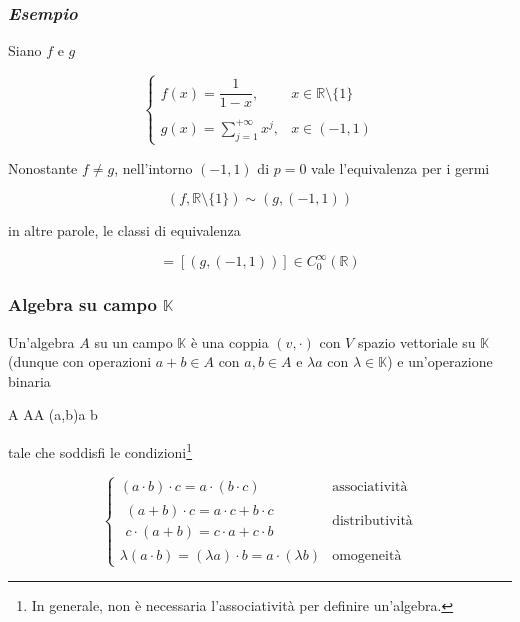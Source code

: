 \subsubsection{\textit{Esempio}}

Siano $ f $ e $ g $

\begin{equation}
	\begin{cases}
		f(x) = \dfrac{1}{1-x}, & x \in \mathbb{R} \setminus \{1\}\\\\
		g(x) = \displaystyle\sum_{j=1}^{+\infty} x^{j}, & x \in (-1,1)
	\end{cases}
\end{equation}

Nonostante $ f\neq g $, nell'intorno $ (-1,1) $ di $ p=0 $ vale l'equivalenza per i germi

\begin{equation}
	(f,\mathbb{R} \setminus \{1\}) \sim (g,(-1,1))
\end{equation}

in altre parole, le classi di equivalenza

\begin{equation}
	[(f,\mathbb{R} \setminus \{1\})] = [(g,(-1,1))] \in C_{0}^{\infty}(\mathbb{R})
\end{equation}

\subsubsection{Algebra su campo $ \mathbb{K} $}

Un'algebra $ A $ su un campo $ \mathbb{K} $ è una coppia $ (v,\cdot) $ con $ V $ spazio vettoriale su $ \mathbb{K} $ (dunque con operazioni $ a+b \in A $ con $ a,b \in A $ e $ \lambda a $ con $ \lambda \in \mathbb{K} $) e un'operazione binaria

\map{\cdot}%
	{A \times A}{A}%
	{(a,b)}{a \cdot b}

tale che soddisfi le condizioni\footnote{%
	In generale, non è necessaria l'associatività per definire un'algebra.}

\begin{equation}
	\begin{cases}
		(a \cdot b) \cdot c = a \cdot (b \cdot c) & \text{associatività}\\
		\begin{split}
			(a + b) \cdot c = a \cdot c + b \cdot c\\
			c \cdot (a + b) = c \cdot a + c \cdot b
		\end{split} & \text{distributività}\\
	\lambda (a \cdot b) = (\lambda a) \cdot b = a \cdot (\lambda b) & \text{omogeneità}
	\end{cases}
\end{equation}


